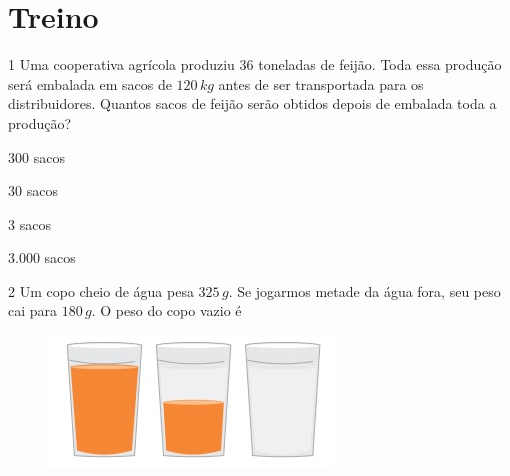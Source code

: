 \section{Treino}

\num{1}  Uma cooperativa agrícola produziu $36$ toneladas de feijão. Toda essa
produção será embalada em sacos de $120\,kg$ antes de ser transportada para
os distribuidores. Quantos sacos de feijão serão obtidos depois de
embalada toda a produção?

\begin{escolha}
\item $300$ sacos
\item $30$ sacos
\item $3$ sacos
\item $3.000$ sacos
\end{escolha}



\num{2}  Um copo cheio de água pesa $325\,g$. Se jogarmos metade da água fora, seu
peso cai para $180\,g$. O peso do copo vazio é

\begin{figure}
\includegraphics[width=2.98958in,height=1.38542in]{./imgSAEB_6_MAT/media/image100.png}
\end{figure}

